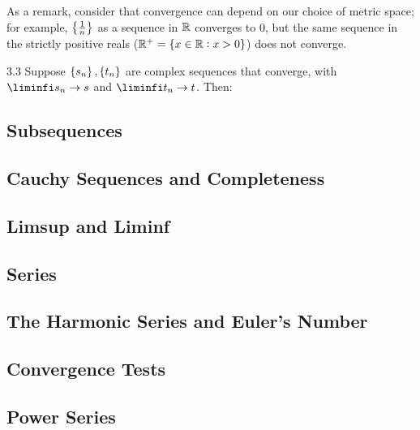 \noindent As a remark, consider that convergence can depend on our choice of metric space; for example, $\set{\frac{1}{n}}$ as a sequence in $\mathbb{R}$ converges to $0$, but the same sequence in the strictly positive reals ($\mathbb{R}^+ = \set{x \in \mathbb{R}: x > 0}$) does not converge.

\begin{theorem}{}{3.3}
    Suppose $\set{s_n}, \set{t_n}$ are complex sequences that converge, with $\liminfi s_n \rightarrow s$ and $\liminfi t_n \rightarrow t$. Then:
\end{theorem}
\subsection{Subsequences}
\subsection{Cauchy Sequences and Completeness}
\subsection{Limsup and Liminf}
\subsection{Series}
\subsection{The Harmonic Series and Euler's Number}
\subsection{Convergence Tests}
\subsection{Power Series}

